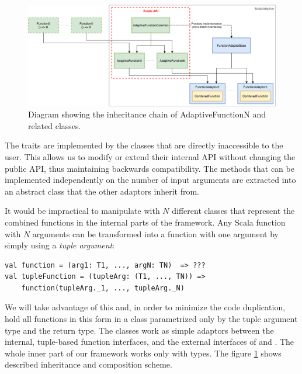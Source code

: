 \begin{figure}[h!]
	\captionsetup{justification=centering,margin=0.5cm}
	\centerline{\mbox{\includegraphics[width=140mm]{./img/inheritance_function_adaptors.png}}}
	\caption{Diagram showing the inheritance chain of AdaptiveFunctionN and related classes.}
	\label{fig:inheritance_function_adaptors}
\end{figure}

The  traits are implemented by the  classes that are directly inaccessible to the user. This allows us to modify or extend their internal API without changing the public API, thus maintaining backwards compatibility. The methods that can be implemented independently on the number of input arguments are extracted into an abstract class  that the other adaptors inherit from.

It would be impractical to manipulate with $N$ different classes that represent the combined functions in the internal parts of the framework. Any Scala function with $N$ arguments can be transformed into a function with one argument by simply using a \textit{tuple argument}:

\lstset{style=Scala}
\begin{lstlisting}
val function = (arg1: T1, ..., argN: TN)  => ???
val tupleFunction = (tupleArg: (T1, ..., TN)) =>
	function(tupleArg._1, ..., tupleArg._N)
\end{lstlisting}

We will take advantage of this and, in order to minimize the code duplication, hold all functions in this form in a  class parametrized only by the tuple argument type and the return type. The  classes work as simple adaptors between the internal, tuple-based function interfaces, and the external interfaces of  and . The whole inner part of our framework works only with  types. The figure \ref{fig:inheritance_function_adaptors} shows described inheritance and composition scheme.

